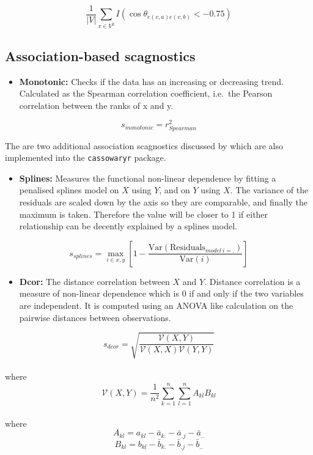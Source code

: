 \[\frac1{|V|}\sum_{v \in V^{2}}I(\cos\theta_{e(v,a)e(v,b)}<-0.75)\]

\subsection{Association-based scagnostics}\label{association-based-scagnostics}

\begin{itemize}
\tightlist
\item
  \textbf{Monotonic:} Checks if the data has an increasing or decreasing trend. Calculated as the Spearman correlation coefficient, i.e.~the Pearson correlation between the ranks of x and y.
\end{itemize}

\[s_{monotonic} = r^2_{Spearman}\]

The are two additional association scagnostics discussed by \citet{Grimm} which are also implemented into the \texttt{cassowaryr} package.

\begin{itemize}
\tightlist
\item
  \textbf{Splines:} Measures the functional non-linear dependence by fitting a penalised splines model on \(X\) using \(Y\), and on \(Y\) using \(X\). The variance of the residuals are scaled down by the axis so they are comparable, and finally the maximum is taken. Therefore the value will be closer to 1 if either relationship can be decently explained by a splines model.
\end{itemize}

\[s_{splines}=\max_{i\in x,y}\left[ 1-\frac{\mbox{Var}(\mbox{Residuals}_{model~i=.})}{\mbox{Var}(i)}\right] \]

\begin{itemize}
\tightlist
\item
  \textbf{Dcor:} The distance correlation \citep{dcor} between \(X\) and \(Y\). Distance correlation is a measure of non-linear dependence which is 0 if and only if the two variables are independent. It is computed using an ANOVA like calculation on the pairwise distances between observations.
\end{itemize}

\[s_{dcor}= \sqrt{\frac{\mathcal{V}(X,Y)}{\mathcal{V}(X,X)\mathcal{V}(Y,Y)}}\]\\
where
\[\mathcal{V}
(X,Y)=\frac{1}{n^2}\sum_{k=1}^n\sum_{l=1}^nA_{kl}B_{kl}\]\\
where
\[A_{kl}=a_{kl}-\bar{a}_{k.}-\bar{a}_{.j}-\bar{a}_{..}\]
\[B_{kl}=b_{kl}-\bar{b}_{k.}-\bar{b}_{.j}-\bar{b}_{..}\]


